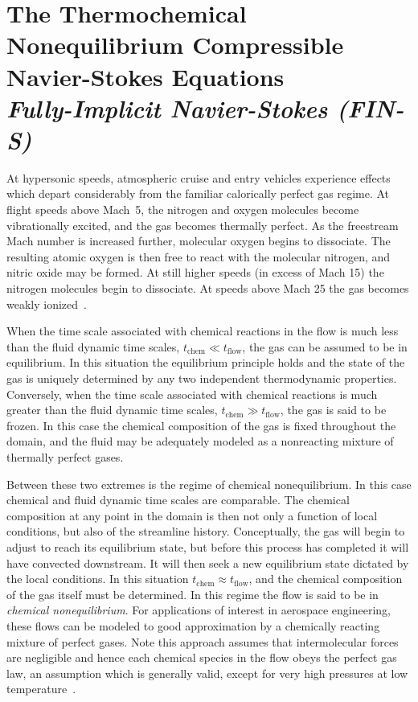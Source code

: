 \chapter[Compressible Navier-Stokes for Reacting Flows]{\label{chap:fin-s}The Thermochemical Nonequilibrium Compressible Navier-Stokes Equations \\ \vspace{1em} \huge{\textit{Fully-Implicit Navier-Stokes (FIN-S)}}}

At hypersonic speeds, atmospheric cruise and entry vehicles experience effects which depart considerably from the familiar calorically perfect gas regime.  At flight speeds above Mach~5, the nitrogen and oxygen molecules become vibrationally excited, and the gas becomes thermally perfect.  As the freestream Mach number is increased further, molecular oxygen begins to dissociate.  The resulting atomic oxygen is then free to react with the molecular nitrogen, and nitric oxide may be formed.  At still higher speeds (in excess of Mach 15) the nitrogen molecules begin to dissociate.  At speeds above Mach 25 the gas becomes weakly ionized~\cite{anderson_hypersonic}.

When the time scale associated with chemical reactions in the flow is much less than the fluid dynamic time scales, $t_{\text{chem}} \ll t_{\text{flow}}$, the gas can be assumed to be in equilibrium.  In this situation the equilibrium principle holds and the state of the gas is uniquely determined by any two independent thermodynamic properties.  Conversely, when the time scale associated with chemical reactions is much greater than the fluid dynamic time scales, $t_{\text{chem}} \gg t_{\text{flow}}$, the gas is said to be frozen.  In this case the chemical composition of the gas is fixed throughout the domain, and the fluid may be adequately modeled as a nonreacting mixture of thermally perfect gases.

Between these two extremes is the regime of chemical nonequilibrium.  In this case chemical and fluid dynamic time scales are comparable.  The chemical composition at any point in the domain is then not only a function of local conditions, but also of the streamline history.  Conceptually, the gas will begin to adjust to reach its equilibrium state, but before this process has completed it will have convected downstream.  It will then seek a new equilibrium state dictated by the local conditions.  In this situation $t_{\text{chem}}\approx t_{\text{flow}}$, and the chemical composition of the gas itself must be determined.  In this regime the flow is said to be in \emph{chemical nonequilibrium}. For applications of interest in aerospace engineering, these flows can be modeled to good approximation by a chemically reacting mixture of perfect gases.  Note this approach assumes that intermolecular forces are negligible and hence each chemical species in the flow obeys the perfect gas law, an assumption which is generally valid, except for very high pressures at low temperature~\cite{anderson_hypersonic}.

